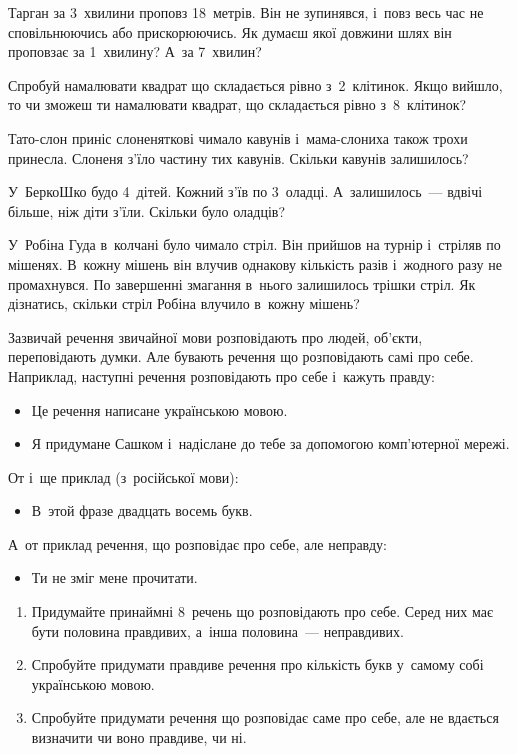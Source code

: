 \problem
Тарган за 3~хвилини проповз 18~метрів.
Він не зупинявся, і~повз весь час не сповільнюючись або прискорюючись.
Як думаєш якої довжини шлях він проповзає за 1~хвилину?
А~за 7~хвилин?


\problem
Спробуй намалювати квадрат що складається рівно з~2~клітинок.
Якщо вийшло, то чи зможеш ти намалювати квадрат,
що складається рівно з~8~клітинок?


\problem
Тато-слон приніс слоненяткові чимало кавунів
і~мама-слониха також трохи принесла.
Слоненя з’їло частину тих кавунів.
Скільки кавунів залишилось?


\problem
У~БеркоШко будо 4~дітей. Кожний з’їв по 3~оладці.
А~залишилось~--- вдвічі більше, ніж діти з’їли.
Скільки було оладців?


\problem
У~Робіна Гуда в~колчані було чимало стріл.
Він прийшов на турнір і~стріляв по мішенях.
В~кожну мішень він влучив однакову кількість разів
і~жодного разу не промахнувся.
По завершенні змагання в~нього залишилось трішки стріл.
Як дізнатись, скільки стріл Робіна влучило в~кожну мішень?


\problem
Зазвичай речення звичайної мови розповідають про людей, об'єкти,
переповідають думки.
Але бувають речення що розповідають самі про себе.
Наприклад, наступні речення розповідають про себе і~кажуть правду:
\begin{itemize}
    \item Це речення написане українською мовою.
    \item Я придумане Сашком і~надіслане до тебе
    за допомогою комп’ютерної мережі.
\end{itemize}
От і~ще приклад (з~російської мови):
\begin{itemize}
    \item В~этой фразе двадцать восемь букв.
\end{itemize}
А~от приклад речення, що розповідає про себе, але неправду:
\begin{itemize}
    \item Ти не зміг мене прочитати.
\end{itemize}

\begin{enumerate}
    \item Придумайте принаймні 8~речень що розповідають про себе.
    Серед них має бути половина правдивих, а~інша половина~--- неправдивих.
    \item Спробуйте придумати правдиве речення про кількість букв
    у~самому собі українською мовою. 
    \item Спробуйте придумати речення що розповідає саме про себе,
    але не вдається визначити чи воно правдиве, чи ні.
\end{enumerate}


